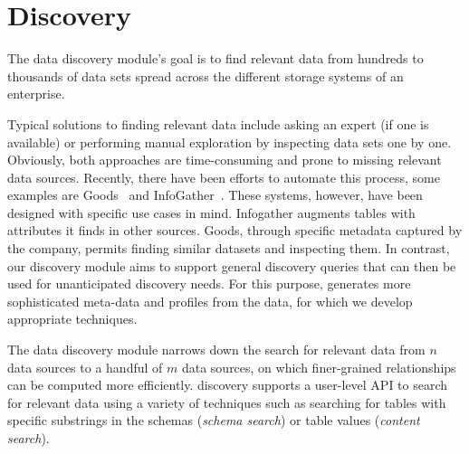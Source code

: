 \section{Discovery}
\label{sec:discovery}

The data discovery module's goal is to find relevant data from hundreds to 
thousands of data sets  spread across the different storage systems
of an enterprise.

Typical solutions to finding relevant data include asking an expert (if one is
available) or  performing manual exploration by inspecting data sets one by
one. Obviously, both approaches are time-consuming and prone to missing
relevant data sources. Recently, there have been efforts to automate this
process, some examples are Goods~\cite{DBLP:conf/sigmod/HalevyKNOPRW16}
and InfoGather~\cite{DBLP:conf/sigmod/YakoutGCC12}. These systems, however, have been designed with specific use cases in mind. Infogather augments tables with attributes it finds in other sources. Goods, through specific metadata captured by the company, permits finding similar datasets and inspecting them. In contrast, our discovery module aims to support general discovery queries that can then be used for unanticipated discovery needs. For this purpose, \dcv generates more sophisticated meta-data and profiles from the data, for which we develop appropriate techniques. %

%


The data discovery module narrows down the search for relevant data from $n$
data sources to a handful of $m$ data sources, on which finer-grained
relationships can be computed more efficiently. \dcv discovery supports a
user-level API to search for relevant data using a variety of techniques such as
searching for tables with specific substrings in the schemas ({\it schema
search}) or table values ({\it content search}). 

